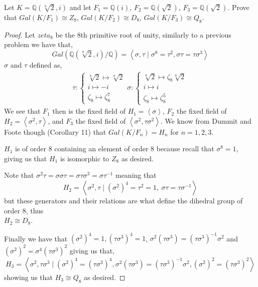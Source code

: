 \documentclass[11pt]{article}
\newenvironment{problem}[2][Problem\!]{\begin{tcolorbox}\begin{trivlist}
\item[\hskip \labelsep {\bfseries #1}\hskip \labelsep {\bfseries #2}]}{\end{trivlist}\end{tcolorbox}}
\newcommand{\qq}{\mathbb Q}   %
\begin{document}
\vspace*{20pt}
\begin{problem}{14.2.6}
  Let $K = \qq(\sqrt[8]{2}, i)$ and let $F_1 = \qq(i)$, $F_2= \qq(\sqrt{2})$, $F_3 = \qq(\sqrt{2})$. Prove that $Gal(K/F_1) \cong Z_8$, $Gal(K/F_2) \cong D_8$, $Gal(K/F_3)\cong Q_8$.
\end{problem}
\begin{proof}
  Let $zeta_8$ be the 8th primitive root of unity, similarly to a previous problem we have that,
  \[Gal(\qq(\sqrt[8]{2}, i)/ \qq) = \left< \sigma, \tau \mid \sigma^{8} = \tau^{2}, \sigma\tau = \tau \sigma^{3} \right>\]
  $\sigma$ and $\tau$ defined as,
  \begin{align*}
    \tau: \begin{cases}
      \sqrt[8]{2} \mapsto \sqrt[8]{2} \\
      i \mapsto -i \\
      \zeta_8 \mapsto \zeta_8^{7}
    \end{cases}
    \sigma: \begin{cases}
      \sqrt[8]{2} \mapsto \zeta_8\sqrt[8]{2} \\
      i \mapsto i\\
      \zeta_8 \mapsto \zeta_8^{5}
    \end{cases}
  \end{align*}
  We see that $F_1$ then is the fixed field of $H_1 = \left< \sigma \right>$, $F_2$ the fixed field of $H_2 = \left<\sigma^{2}, \tau\right>$, and $F_3$ the fixed field of $\left<\sigma^{2}, \tau \sigma^{2}\right>$. We know from Dummit and Foote though (Corollary 11) that $Gal(K/F_n) = H_n$ for $n = 1,2,3$. 

  $H_1$ is of order 8 containing an element of order 8 because recall that $\sigma^{8} = 1$, giving us that $H_1$ is isomorphic to $Z_8$ as desired. 

  Note that $\sigma^{2}\tau = \sigma\sigma\tau = \sigma\tau\sigma^{3} = \sigma\tau^{-1}$ meaning that \[H_2 = \left< \sigma^{2} , \tau\mid (\sigma^{2})^{4} = \tau^{2} = 1, \ \sigma\tau = \tau \sigma^{-1} \right>\] but these generators and their relations are what define the dihedral group of order 8, thus \\ $H_2 \cong D_8$.

  Finally we have that $(\sigma^{2})^{4} = 1, (\tau\sigma^{3})^{4} = 1$, $\sigma^{2}(\tau\sigma^{3}) = (\tau\sigma^{3})^{-1}\sigma^{2}$ and $(\sigma^{2})^{2} = \sigma^{4} (\tau\sigma^{3})^{2}$ giving us that,
  \[H_3 = \left<\sigma^{2}, \tau\sigma^{3} \mid (\sigma^{2})^{4} = (\tau\sigma^{3})^{4}, \sigma^{2}(\tau\sigma^{3}) = (\tau\sigma^{3})^{-1}\sigma^{2}, (\sigma^{2})^{2} = (\tau\sigma^{3})^{2}  \right>\]
  showing us that $H_3 \cong Q_8$ as desired.
\end{proof}
\end{document}
